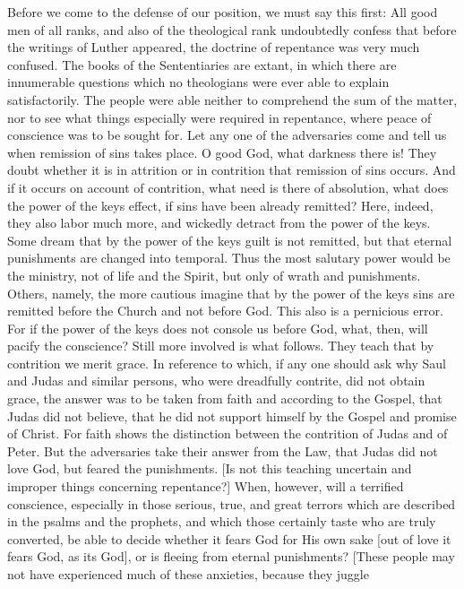 Before we come to the defense of our position, we must say this first:
All good men of all ranks, and also of the theological rank
undoubtedly confess that before the writings of Luther appeared, the
doctrine of repentance was very much confused.  The books of the
Sententiaries are extant, in which there are innumerable questions
which no theologians were ever able to explain satisfactorily.  The
people were able neither to comprehend the sum of the matter, nor to
see what things especially were required in repentance, where peace
of conscience was to be sought for.  Let any one of the adversaries
come and tell us when remission of sins takes place.  O good God,
what darkness there is!  They doubt whether it is in attrition or in
contrition that remission of sins occurs.  And if it occurs on
account of contrition, what need is there of absolution, what does
the power of the keys effect, if sins have been already remitted?
Here, indeed, they also labor much more, and wickedly detract from
the power of the keys.  Some dream that by the power of the keys
guilt is not remitted, but that eternal punishments are changed into
temporal.  Thus the most salutary power would be the ministry, not of
life and the Spirit, but only of wrath and punishments.  Others,
namely, the more cautious imagine that by the power of the keys sins
are remitted before the Church and not before God.  This also is a
pernicious error.  For if the power of the keys does not console us
before God, what, then, will pacify the conscience?  Still more
involved is what follows.  They teach that by contrition we merit
grace.  In reference to which, if any one should ask why Saul and
Judas and similar persons, who were dreadfully contrite, did not
obtain grace, the answer was to be taken from faith and according to
the Gospel, that Judas did not believe, that he did not support
himself by the Gospel and promise of Christ.  For faith shows the
distinction between the contrition of Judas and of Peter.  But the
adversaries take their answer from the Law, that Judas did not love
God, but feared the punishments.  [Is not this teaching uncertain and
improper things concerning repentance?] When, however, will a
terrified conscience, especially in those serious, true, and great
terrors which are described in the psalms and the prophets, and which
those certainly taste who are truly converted, be able to decide
whether it fears God for His own sake [out of love it fears God, as
its God], or is fleeing from eternal punishments?  [These people may
not have experienced much of these anxieties, because they juggle
